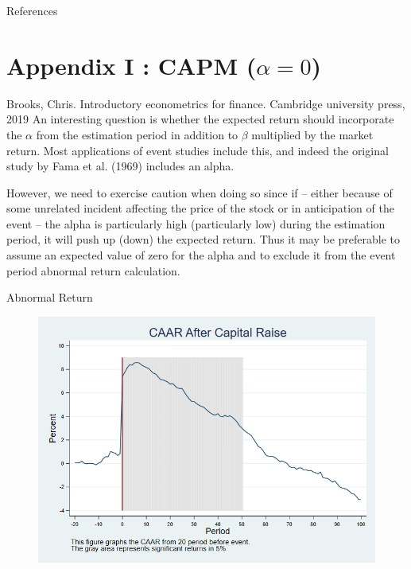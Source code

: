 \documentclass{beamer}
\begin{document}
%


	\tiny
\begin{frame}[allowframebreaks]{References}
	
	{		
		
		
	}
\end{frame}

\normalsize





\appendix

\section{Appendix I : CAPM ($ \alpha = 0 $)}


\begin{frame}
	\begin{block}{\footnotesize Brooks, Chris. Introductory econometrics for finance. Cambridge university press, 2019}
		\scriptsize
		An interesting question is whether the expected return should
		incorporate the $ \alpha $ from the estimation period in addition to $ \beta $ multiplied by the market return.
		Most applications of event studies include this, and indeed the original study by Fama et al. (1969) includes an alpha.
		
		However, we need to exercise caution when doing so since if – either
		because of some unrelated incident affecting the price of the stock or in
		anticipation of the event – the alpha is particularly high (particularly low) during the estimation period, it will push up (down) the expected return.
		Thus it may be preferable to assume an expected value of zero for the
		alpha and to exclude it from the event period abnormal return calculation.
	\end{block}
\end{frame}

\begin{frame}{Abnormal Return}
	\label{abreturnWithoutAlpha}
	\begin{figure}
		\centering
		\includegraphics[width=0.7\linewidth]{AbReturn_WithoutAlpha.png}
		\label{fig:abreturn3}
	\end{figure}
	\hfill\hyperlink{abreturn}{}
\end{frame}
\end{document}
